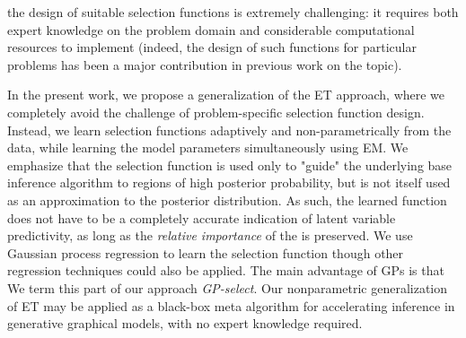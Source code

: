  the design of suitable selection functions is extremely challenging: it requires both expert knowledge
on the problem domain and considerable computational resources to implement
 (indeed, the design of such functions for  particular problems
has been a major contribution in previous work on the topic).

In the present work, we propose a generalization of the ET approach, where
we completely avoid  the challenge of problem-specific selection function design.
Instead, we learn selection functions  adaptively and non-parametrically
from the data,
 while learning the model
parameters  simultaneously using EM.
We emphasize that the selection function is  used only to "guide" the underlying
base inference algorithm to regions of high posterior probability, but is not itself
used as an approximation to the posterior distribution. 
As such, the learned
function does not have to be a completely accurate indication of latent
variable predictivity,
as long as the \emph{relative importance} of the  is preserved.
We use  Gaussian process
regression \citep{RasmussenGPbook} to learn the selection function  though other regression techniques could
also be applied. 
The main advantage of GPs is that 
We term this part of our approach
\textit{GP-select}.
Our nonparametric generalization of  ET may be applied as a black-box
meta algorithm for accelerating inference in  generative graphical models,
with no expert knowledge required.



